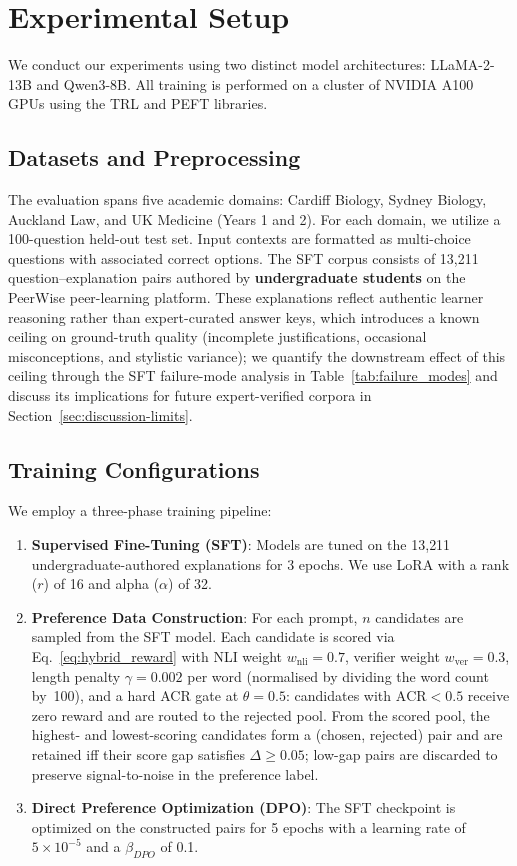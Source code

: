 \section{Experimental Setup}

We conduct our experiments using two distinct model architectures: LLaMA-2-13B and Qwen3-8B. All training is performed on a cluster of NVIDIA A100 GPUs using the TRL and PEFT libraries.

\subsection{Datasets and Preprocessing}
The evaluation spans five academic domains: Cardiff Biology, Sydney Biology, Auckland Law, and UK Medicine (Years 1 and 2). For each domain, we utilize a 100-question held-out test set. Input contexts are formatted as multi-choice questions with associated correct options. The SFT corpus consists of 13{,}211 question--explanation pairs authored by \textbf{undergraduate students} on the PeerWise peer-learning platform. These explanations reflect authentic learner reasoning rather than expert-curated answer keys, which introduces a known ceiling on ground-truth quality (incomplete justifications, occasional misconceptions, and stylistic variance); we quantify the downstream effect of this ceiling through the SFT failure-mode analysis in Table~\ref{tab:failure_modes} and discuss its implications for future expert-verified corpora in Section~\ref{sec:discussion-limits}.

\subsection{Training Configurations}
We employ a three-phase training pipeline:
\begin{enumerate}
    \item \textbf{Supervised Fine-Tuning (SFT)}: Models are tuned on the 13{,}211 undergraduate-authored explanations for 3 epochs. We use LoRA with a rank ($r$) of 16 and alpha ($\alpha$) of 32.
    \item \textbf{Preference Data Construction}: For each prompt, $n$ candidates are sampled from the SFT model. Each candidate is scored via Eq.~\ref{eq:hybrid_reward} with NLI weight $w_{\text{nli}}=0.7$, verifier weight $w_{\text{ver}}=0.3$, length penalty $\gamma=0.002$ per word (normalised by dividing the word count by~100), and a hard ACR gate at $\theta=0.5$: candidates with $\mathrm{ACR}<0.5$ receive zero reward and are routed to the rejected pool. From the scored pool, the highest- and lowest-scoring candidates form a (chosen, rejected) pair and are retained iff their score gap satisfies $\Delta \geq 0.05$; low-gap pairs are discarded to preserve signal-to-noise in the preference label.
    \item \textbf{Direct Preference Optimization (DPO)}: The SFT checkpoint is optimized on the constructed pairs for 5 epochs with a learning rate of $5 \times 10^{-5}$ and a $\beta_{DPO}$ of 0.1.
\end{enumerate}

